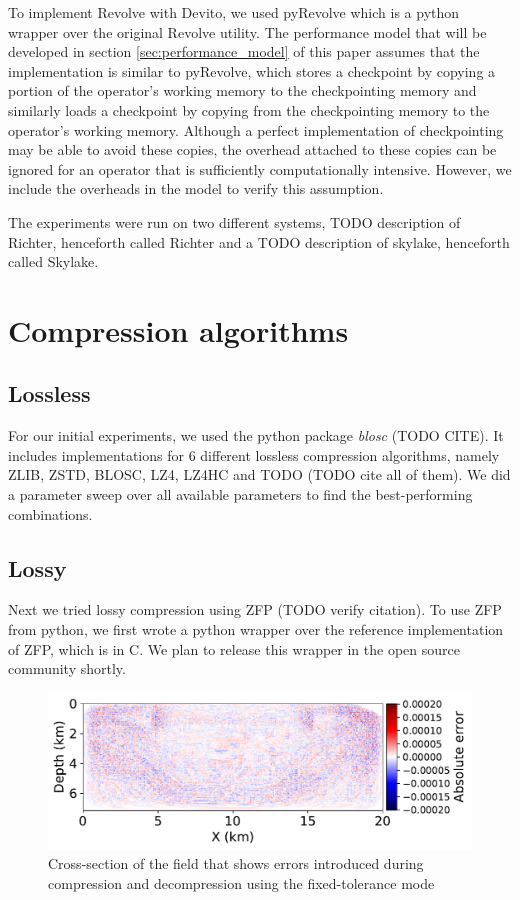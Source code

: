 \documentclass[conference]{IEEEtran}
\begin{document}
To implement Revolve with Devito, we used pyRevolve \cite{kukreja2018high} which is a python wrapper over the
original Revolve utility. The performance model that will be developed in section \ref{sec:performance_model} of
this paper assumes that the implementation is similar to pyRevolve, which stores a checkpoint by copying a portion
of the operator's working memory to the checkpointing memory and similarly loads a checkpoint by copying from the
checkpointing memory to the operator's working memory. Although a perfect implementation of checkpointing may
be able to avoid these copies, the overhead attached to these copies can be ignored for an operator that is
sufficiently computationally intensive. However, we include the overheads in the model to verify this assumption. 

The experiments were run on two different systems, TODO description of Richter, henceforth called Richter and a
TODO description of skylake, henceforth called Skylake.


\section{Compression algorithms}
\subsection{Lossless}
For our initial experiments, we used the python package \emph{blosc} (TODO CITE). It includes implementations for
6 different lossless compression algorithms, namely ZLIB, ZSTD, BLOSC, LZ4, LZ4HC and TODO (TODO cite all of them).
We did a parameter sweep over all available parameters to find the best-performing combinations. 
\subsection{Lossy}
Next we tried lossy compression using ZFP \cite{ratanaworabhan2006fast} (TODO verify citation). To use ZFP from python, 
we first wrote a python wrapper over the reference implementation of ZFP, which is in C. We plan to release this wrapper
in the open source community shortly. 

\begin{figure}
\begin{center}
\includegraphics[width=0.8\linewidth]{images/errors.pdf}
\end{center}
\caption{Cross-section of the field that shows errors introduced during compression and decompression using the fixed-tolerance mode}
\label{fig:decompressed_error}
\end{figure}
\end{document}
